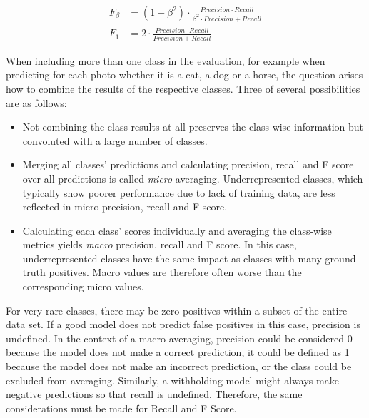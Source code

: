 \begin{align}
    F_\beta &= (1 + \beta^2) \cdot \frac{Precision \cdot Recall}{\beta^2 \cdot Precision + Recall}
    \label{eq:3_basics/4_metrics/3_prf/f_beta} \\
    F_1 &= 2 \cdot \frac{Precision \cdot Recall}{Precision + Recall}
    \label{eq:3_basics/4_metrics/3_prf/f_1}
\end{align}

When including more than one class in the evaluation, for example when predicting for each photo whether it is a cat, a dog or a horse, the question arises how to combine the results of the respective classes. Three of several possibilities are as follows:

\begin{itemize}
    \item Not combining the class results at all preserves the class-wise information but convoluted with a large number of classes.

    \item Merging all classes' predictions and calculating precision, recall and F score over all predictions is called \emph{micro} averaging. Underrepresented classes, which typically show poorer performance due to lack of training data, are less reflected in micro precision, recall and F score.

    \item Calculating each class' scores individually and averaging the class-wise metrics yields \emph{macro} precision, recall and F score. In this case, underrepresented classes have the same impact as classes with many ground truth positives. Macro values are therefore often worse than the corresponding micro values.
\end{itemize}

For very rare classes, there may be zero positives within a subset of the entire data set. If a good model does not predict false positives in this case, precision is undefined. In the context of a macro averaging, precision could be considered 0 because the model does not make a correct prediction, it could be defined as 1 because the model does not make an incorrect prediction, or the class could be excluded from averaging. Similarly, a withholding model might always make negative predictions so that recall is undefined. Therefore, the same considerations must be made for Recall and F Score.
